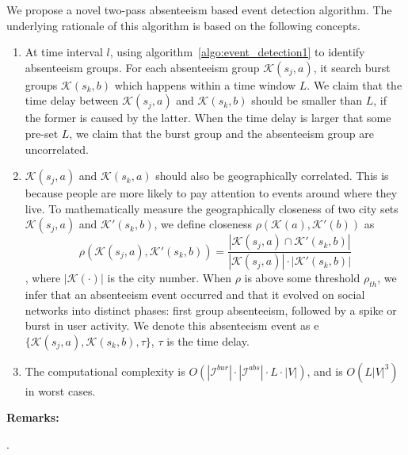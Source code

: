 We propose a novel two-pass absenteeism based event detection algorithm. The underlying rationale of this algorithm is based on the following concepts.
\begin{enumerate}
\item At time interval $l$, using algorithm~\ref{algo:event_detection1} to identify absenteeism groups. For each absenteeism group $\mathcal{K}(s_j,a)$, it search burst groups $\mathcal{K}(s_k,b)$ which happens within a time window $L$. We claim that the time delay between $\mathcal{K}(s_j,a)$ and $\mathcal{K}(s_k,b)$ should be smaller than $L$, if the former is caused by the latter. When the time delay is larger that some pre-set $L$,  we claim that the burst group and the absenteeism group are uncorrelated.
\item $\mathcal{K}(s_j,a)$ and $\mathcal{K}(s_k,a)$ should also be geographically correlated. This is because people are more likely to pay attention to events around where they live. To mathematically measure the geographically closeness of two city sets $\mathcal{K}(s_j,a)$ and $\mathcal{K'}(s_k,b)$, we define closeness $\rho(\mathcal{K}(a),\mathcal{K'}(b))$ as
\begin{equation}
\label{eq:eventsimilarity}
\rho(\mathcal{K}(s_j,a),\mathcal{K'}(s_k,b)) = \frac{|\mathcal{K}(s_j,a)\cap\mathcal{K'}(s_k,b)|}{|\mathcal{K}(s_j,a)|\cdot|\mathcal{K'}(s_k,b)|}
\end{equation}, where $|\mathcal{K}(\cdot)|$ is the city number. When $\rho$ is above some threshold $\rho_{th}$, we infer that an absenteeism event occurred and that it evolved on social networks into distinct phases: first group absenteeism, followed by a spike or burst in user activity. We denote this absenteeism event as e$\{\mathcal{K}(s_j,a),\mathcal{K}(s_k,b),\tau\}$, $\tau$ is the time delay.
\item The computational complexity is $O(|\mathcal{I}^{bur}|\cdot |\mathcal{I}^{abs}|\cdot L\cdot |V|)$, and is $O(L|V|^3)$ in worst cases.
\end{enumerate}

\noindent\textbf{Remarks:}

.


